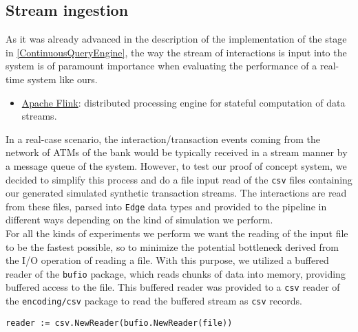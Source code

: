 \subsection{Stream ingestion}\label{exps-input-reading}

As it was already advanced in the description of the implementation of the \source \Sr stage in \ref{ContinuousQueryEngine}, the way the stream of interactions is input into the \DPATM system is of paramount importance when evaluating the performance of a real-time system like ours.

\begin{itemize}
  \item \href{https://www.confluent.io/es-es/learn/apache-flink/}{Apache Flink}: distributed processing engine for stateful computation of data streams.
\end{itemize}

In a real-case scenario, the interaction/transaction events coming from the network of ATMs of the bank would be typically received in a stream manner by a message queue of the \DPATM system. However, to test our proof of concept \DPATM system, we decided to simplify this process and do a file input read of the \texttt{csv} files containing our generated simulated synthetic transaction streams. The interactions are read from these files, parsed into \texttt{Edge} data types and provided to the pipeline in different ways depending on the kind of simulation we perform. \\

For all the kinds of experiments we perform we want the reading of the input file to be the fastest possible, so to minimize the potential bottleneck derived from the I/O operation of reading a file. With this purpose, we utilized a buffered reader of the \texttt{bufio} package, which reads chunks of data into memory, providing buffered access to the file. This buffered reader was provided to a \texttt{csv} reader of the \texttt{encoding/csv} package to read the buffered stream as \texttt{csv} records.


    \begin{center}
    \lstset{style=golangStyle}
    \begin{lstlisting}[caption={\texttt{csv-bufio} reader}]
        reader := csv.NewReader(bufio.NewReader(file))
    \end{lstlisting}
    \end{center}
    
